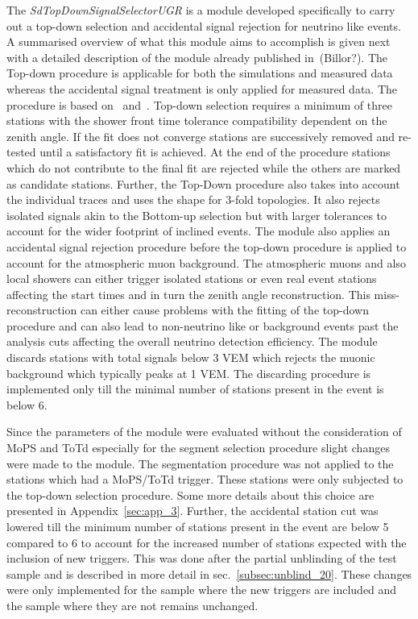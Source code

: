 The \textit{SdTopDownSignalSelectorUGR} is a module developed specifically to carry out a top-down selection and accidental signal rejection for neutrino like events. A summarised overview of what this module aims to accomplish is given next with a detailed description of the module already published in~\cite{}(Billor?). The Top-down procedure is applicable for both the simulations and measured data whereas the accidental signal treatment is only applied for measured data. The procedure is based on~\cite{} and~\cite{}. Top-down selection requires a minimum of three stations with the shower front time tolerance compatibility dependent on the zenith angle. If the fit does not converge stations are successively removed and re-tested until a satisfactory fit is achieved. At the end of the procedure stations which do not contribute to the final fit are rejected while the others are marked as candidate stations. Further, the Top-Down procedure also takes into account the individual traces and uses the shape for 3-fold topologies. It also rejects isolated signals akin to the Bottom-up selection but with larger tolerances to account for the wider footprint of inclined events. The module also applies an accidental signal rejection procedure before the top-down procedure is applied to account for the atmospheric muon background. The atmospheric muons and also local showers can either trigger isolated stations or even real event stations affecting the start times and in turn the zenith angle reconstruction. This miss-reconstruction can either cause problems with the fitting of the top-down procedure and can also lead to non-neutrino like or background events past the analysis cuts affecting the overall neutrino detection efficiency. The module discards stations with total signals below 3 VEM which rejects the muonic background which typically peaks at 1 VEM. The discarding procedure is implemented only till the minimal number of stations present in the event is below 6.

Since the parameters of the module were evaluated without the consideration of MoPS and ToTd especially for the segment selection procedure slight changes were made to the module. The segmentation procedure was not applied to the stations which had a MoPS/ToTd trigger. These stations were only subjected to the top-down selection procedure. Some more details about this choice are presented in Appendix~\ref{sec:app_3}. Further, the accidental station cut was lowered till the minimum number of stations present in the event are below 5 compared to 6 to account for the increased number of stations expected with the inclusion of new triggers. This was done after the partial unblinding of the test sample and is described in more detail in sec.~\ref{subsec:unblind_20}. These changes were only implemented for the sample where the new triggers are included and the sample where they are not remains unchanged. 

